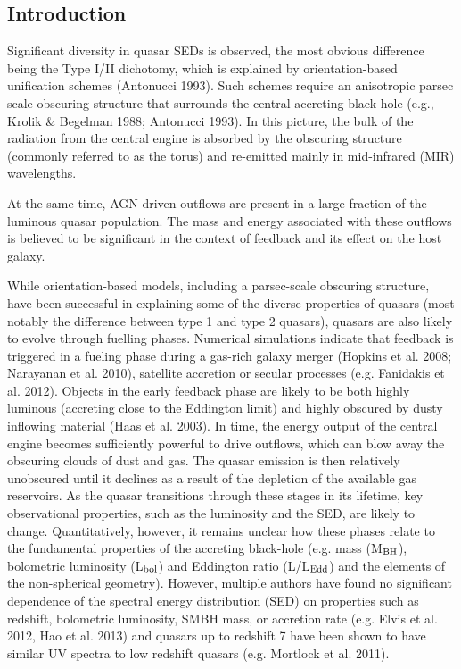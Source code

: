 \subsection{Introduction}

Significant diversity in quasar SEDs is observed, the most obvious difference being the Type I/II dichotomy, which is explained by orientation-based unification schemes (Antonucci 1993). 
Such schemes require an anisotropic parsec scale obscuring structure that surrounds the central accreting black hole (e.g., Krolik \& Begelman 1988; Antonucci 1993). 
In this picture, the bulk of the radiation from the central engine is absorbed by the obscuring structure (commonly referred to as the torus) and re-emitted mainly in mid-infrared (MIR) wavelengths. 

At the same time, AGN-driven outflows are present in a large fraction of the luminous quasar population. 
The mass and energy associated with these outflows is believed to be significant in the context of feedback and its effect on the host galaxy. 

While orientation-based models, including a parsec-scale obscuring structure, have been successful in explaining some of the diverse properties of quasars (most notably the difference between type 1 and type 2 quasars), quasars are also likely to evolve through fuelling phases. 
Numerical simulations indicate that feedback is triggered in a fueling phase during a gas-rich galaxy merger (Hopkins et al. 2008; Narayanan et al. 2010), satellite accretion or secular processes (e.g. Fanidakis et al. 2012). 
Objects in the early feedback phase are likely to be both highly luminous (accreting close to the Eddington limit) and highly obscured by dusty inflowing material (Haas et al. 2003). 
In time, the energy output of the  central engine becomes sufficiently powerful to drive outflows, which can blow away the obscuring clouds of dust and gas. 
The quasar emission is then relatively unobscured until it declines as a result of the depletion of the available gas reservoirs. 
As the quasar transitions through these stages in its lifetime, key observational properties, such as the luminosity and the SED, are likely to change. 
Quantitatively, however, it remains unclear how these phases relate to the fundamental properties of the accreting black-hole (e.g.  mass (M$_{\rm{BH}}$), bolometric luminosity (L$_{\rm{bol}}$) and Eddington ratio (L/L$_{\rm{Edd}}$) and the elements of the non-spherical geometry). 
However, multiple authors have found no significant dependence of the spectral energy distribution (SED) on properties such as redshift, bolometric luminosity, SMBH mass, or accretion rate (e.g. Elvis et al. 2012, Hao et al. 2013) and quasars up to redshift 7 have been shown to have similar UV spectra to low redshift quasars (e.g. Mortlock et al. 2011). 

